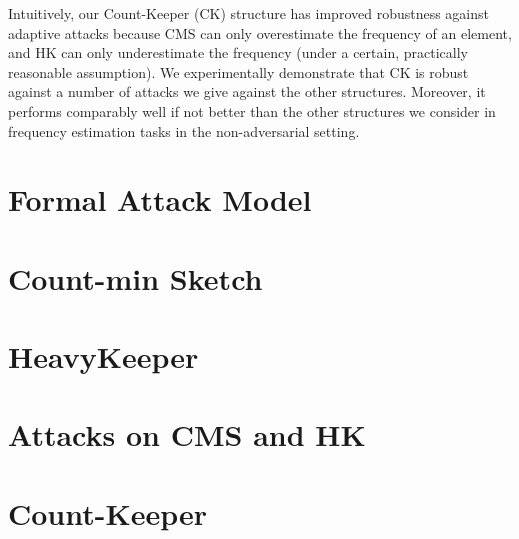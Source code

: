 Intuitively, our Count-Keeper (CK) structure has improved robustness against adaptive attacks because CMS can only overestimate the frequency of an element, and HK can only underestimate the frequency (under a certain, practically reasonable assumption). We experimentally demonstrate that CK is robust against a number of attacks we give against the other structures. Moreover, it performs comparably well if not better than the other structures we consider in frequency estimation tasks in the non-adversarial setting.


\section{Formal Attack Model}\label{sec:adv}



\section{Count-min Sketch}\label{sec:cms}
   
   

\section{HeavyKeeper}\label{sec:hk}
   
   

\section{Attacks on CMS and HK}\label{sec:attacks}


\section{Count-Keeper}\label{sec:ck}

